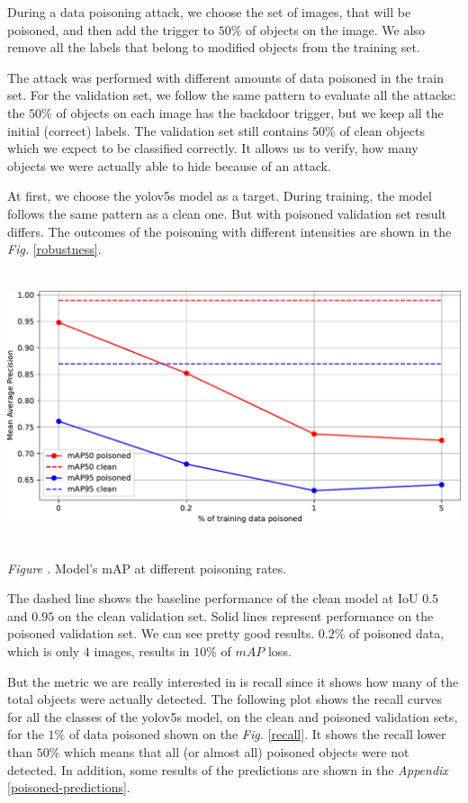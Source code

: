 \documentclass[14pt,a4paper]{extarticle}
\newcounter{e}
\newcounter{pic}
\newcommand{\pic}[1]{\refstepcounter{pic} \vspace{-0.3cm}\textit{Figure \arabic{pic}\label{#1}.}}
\numberwithin{equation}{section}
\numberwithin{figure}{section}
\begin{document}
During a data poisoning attack, we choose the set of images, that will be poisoned, and then add the trigger to $50\%$ of objects on the image. We also remove all the labels that belong to modified objects from the training set.

The attack was performed with different amounts of data poisoned in the train set.
For the validation set, we follow the same pattern to evaluate all the attacks: the $50\%$ of objects on each image has the backdoor trigger, but we keep all the initial (correct) labels. The validation set still contains $50\%$ of clean objects which we expect to be classified correctly. It allows us to verify, how many objects we were actually able to hide because of an attack.

At first, we choose the yolov5s model as a target. During training, the model follows the same pattern as a clean one.
But with poisoned validation set result differs.
The outcomes of the poisoning with different intensities are shown in the \textit{Fig.} \ref{robustness}.

\begin{center}
    \includegraphics[height=8cm]{images/robustness.pdf}
\end{center}
\begin{center}
    \pic{robustness} Model's mAP at different poisoning rates.
\end{center}

The dashed line shows the baseline performance of the clean model at IoU $0.5$ and $0.95$ on the clean validation set.
Solid lines represent performance on the poisoned validation set. We can see pretty good results. $0.2\%$ of poisoned data, which is only $4$ images, results in $10\%$ of $mAP$ loss.

But the metric we are really interested in is recall since it shows how many of the total objects were actually detected. The following plot shows the recall curves for all the classes of the yolov5s model, on the clean and poisoned validation sets, for the $1\%$ of data poisoned shown on the \textit{Fig.} \ref{recall}. It shows the recall lower than $50\%$ which means that all (or almost all) poisoned objects were not detected. In addition, some results of the predictions are shown in the \textit{Appendix} \ref{poisoned-predictions}.
\end{document}
